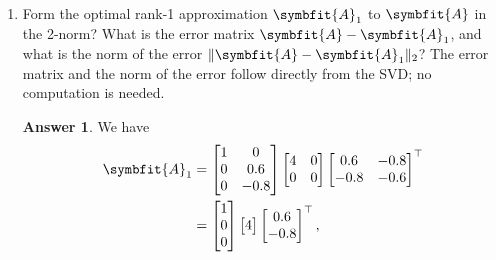 \documentclass{article}
\theoremstyle{definition}
\newtheorem*{answer}{Answer}
\newcommand{\mat}[1]{\symbfit{#1}}
\begin{document}
\begin{enumerate}[leftmargin=\labelsep]
\begin{enumerate}
		      \item Form the optimal rank-1 approximation \(\mat{A}_1\) to \(\mat{A}\) in the 2-norm? What is the error matrix \(\mat{A} - \mat{A}_1\), and what is the norm of the error \(\|\mat{A} - \mat{A}_1\|_2\)? The error matrix and the norm of the error follow directly from the SVD; no computation is needed.
		            \begin{answer}
			            We have
			            \begin{align*}
				            \mat{A}_1                 & = \begin{bmatrix}
					                                          1 & 0    \\
					                                          0 & 0.6  \\
					                                          0 & -0.8
				                                          \end{bmatrix}
				            \begin{bmatrix}
					            4 & 0 \\
					            0 & 0
				            \end{bmatrix}
				            \begin{bmatrix}
					            0.6  & -0.8 \\
					            -0.8 & -0.6 \\
				            \end{bmatrix}^\top                                                                                \\
				                                      & = \begin{bmatrix}
					                                          1 \\
					                                          0 \\
					                                          0
				                                          \end{bmatrix}
				            \begin{bmatrix}
					            4
				            \end{bmatrix}
				            \begin{bmatrix}
					            0.6  \\
					            -0.8 \\
				            \end{bmatrix}^\top,                                                                               \\

\end{align*}
\end{answer}
\end{enumerate}
\end{enumerate}
\end{document}
